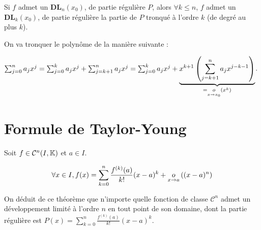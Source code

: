 \documentclass[12pt, a4paper]{report}
\begin{document}
\begin{property}
    Si $f$ admet un $\mathbf{DL}_n(x_0)$, de partie régulière $P$, alors $\forall k \le n$, $f$ admet un $\mathbf{DL}_k(x_0)$, de partie régulière la partie de $P$ tronqué à l'ordre $k$ (de degré au plus $k$).

    On va tronquer le polynôme de la manière suivante :
    
    $\sum_{j=0}^{n}a_jx^j=\sum_{j=0}^{k}a_jx^j + \sum_{j=k+1}^{n}a_jx^j=\sum_{j=0}^{k}a_jx^j+\underbrace{x^{k+1}\left(\sum_{j=k+1}^{n}a_jx^{j-k-1}\right)}_{=\underset{x\to x_0}{o}(x^{k})}$.
\end{property}

\section{Formule de Taylor-Young}

\begin{theorem}
    Soit $f \in \mathcal{C}^n(I,\mathbb{K})$ et $a\in I$.

    $$\forall x \in I, f(x) = \sum_{k=0}^{n} \frac{f^{(k)}(a)}{k!}(x-a)^k + \underset{x\to a}{o}\left((x-a)^n\right)$$
\end{theorem}

On déduit de ce théorème que n'importe quelle fonction de classe $\mathcal{C}^n$ admet un développement limité à l'ordre $n$ en tout point de son domaine, dont la partie régulière est $P(x)=\sum_{k=0}^{n}\frac{f^{(k)}(a)}{k!}(x-a)^k$.
\end{document}

